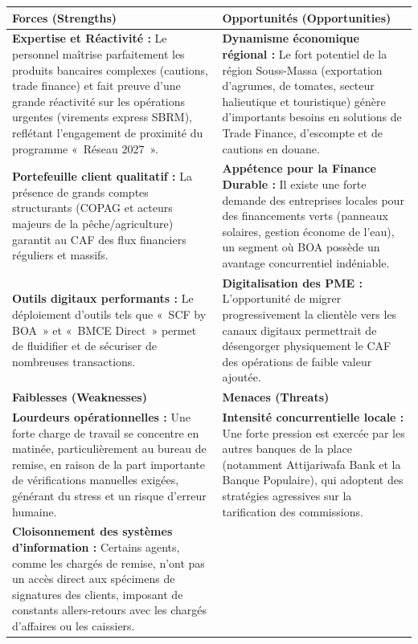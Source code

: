\documentclass[12pt,a4paper]{report}
\begin{document}
\begin{table}[h!]
\centering
\renewcommand{\arraystretch}{1.4}
\begin{tabularx}{\textwidth}{|X|X|}
\hline
\rowcolor{gray!20}
\textbf{Forces (Strengths)} & \textbf{Opportunités (Opportunities)} \\
\hline
\textbf{Expertise et Réactivité :} Le personnel maîtrise parfaitement les produits bancaires complexes (cautions, trade finance) et fait preuve d'une grande réactivité sur les opérations urgentes (virements express SBRM), reflétant l'engagement de proximité du programme «~Réseau 2027~».
&
\textbf{Dynamisme économique régional :} Le fort potentiel de la région Souss-Massa (exportation d'agrumes, de tomates, secteur halieutique et touristique) génère d'importants besoins en solutions de Trade Finance, d'escompte et de cautions en douane. \\
\hline
\textbf{Portefeuille client qualitatif :} La présence de grands comptes structurants (COPAG et acteurs majeurs de la pêche/agriculture) garantit au CAF des flux financiers réguliers et massifs.
&
\textbf{Appétence pour la Finance Durable :} Il existe une forte demande des entreprises locales pour des financements verts (panneaux solaires, gestion économe de l'eau), un segment où BOA possède un avantage concurrentiel indéniable. \\
\hline
\textbf{Outils digitaux performants :} Le déploiement d'outils tels que «~SCF by BOA~» et «~BMCE Direct~» permet de fluidifier et de sécuriser de nombreuses transactions.
&
\textbf{Digitalisation des PME :} L'opportunité de migrer progressivement la clientèle vers les canaux digitaux permettrait de désengorger physiquement le CAF des opérations de faible valeur ajoutée. \\
\hline
\rowcolor{gray!20}
\textbf{Faiblesses (Weaknesses)} & \textbf{Menaces (Threats)} \\
\hline
\textbf{Lourdeurs opérationnelles :} Une forte charge de travail se concentre en matinée, particulièrement au bureau de remise, en raison de la part importante de vérifications manuelles exigées, générant du stress et un risque d'erreur humaine.
&
\textbf{Intensité concurrentielle locale :} Une forte pression est exercée par les autres banques de la place (notamment Attijariwafa Bank et la Banque Populaire), qui adoptent des stratégies agressives sur la tarification des commissions. \\
\hline
\textbf{Cloisonnement des systèmes d'information :} Certains agents, comme les chargés de remise, n'ont pas un accès direct aux spécimens de signatures des clients, imposant de constants allers-retours avec les chargés d'affaires ou les caissiers.

\end{tabularx}
\end{table}
\end{document}
